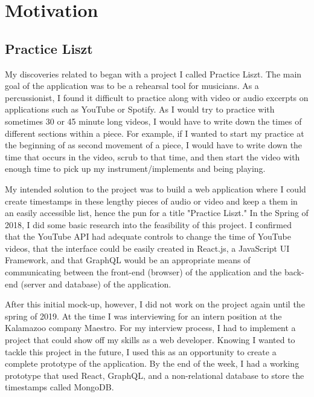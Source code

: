 \section{Motivation}

\subsection{Practice Liszt}
My discoveries related to began with a project I called Practice Liszt.  The main goal of the application was to be a rehearsal tool for musicians. As a percussionist, I found it difficult to practice along with video or audio excerpts on applications such as YouTube or Spotify.  As I would try to practice with sometimes 30 or 45 minute long videos, I would have to write down the times of different sections within a piece.  For example, if I wanted to start my practice at the beginning of as second movement of a piece, I would have to write down the time that occurs in the video, scrub to that time, and then start the video with enough time to pick up my instrument/implements and being playing.

My intended solution to the project was to build a web application where I could create timestamps in these lengthy pieces of audio or video and keep a them in an easily accessible list, hence the pun for a title "Practice Liszt." In the Spring of 2018, I did some basic research into the feasibility of this project.  I confirmed that the YouTube API had adequate controls to change the time of YouTube videos, that the interface could be easily created in React.js, a JavaScript UI Framework, and that GraphQL would be an appropriate means of communicating between the front-end (browser) of the application and the back-end (server and database) of the application.

After this initial mock-up, however, I did not work on the project again until the spring of 2019.  At the time I was interviewing for an intern position at the Kalamazoo company Maestro.  For my interview process, I had to implement a project that could show off my skills as a web developer.  Knowing I wanted to tackle this project in the future, I used this as an opportunity to create a complete prototype of the application.  By the end of the week, I had a working prototype that used React, GraphQL, and a non-relational database to store the timestamps called MongoDB.

